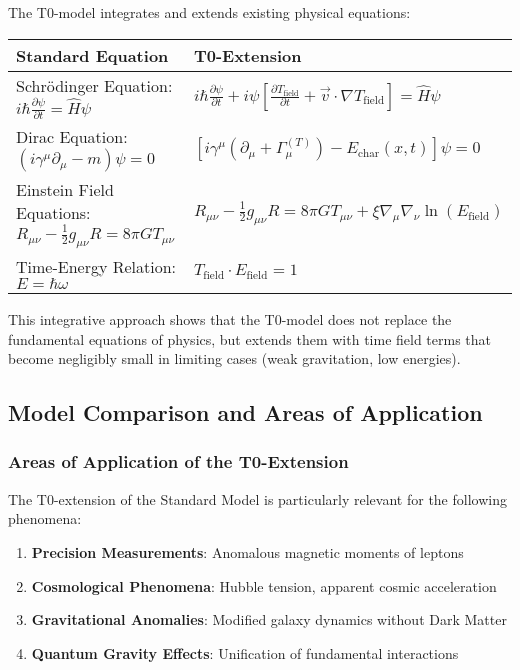 \documentclass[12pt,a4paper]{article}
\newcommand{\tfield}{T_{\text{field}}}
\theoremstyle{definition}
\begin{document}
	The T0-model integrates and extends existing physical equations:
	
	\begin{center}
		\begin{tabular}{|p{6cm}|p{8.5cm}|}
			\hline
			\textbf{Standard Equation} & \textbf{T0-Extension} \\
			\hline
			Schrödinger Equation: $i \hbar \frac{\partial\psi}{\partial t} = \hat{H}\psi$ & $i \hbar \frac{\partial\psi}{\partial t} + i\psi\left[\frac{\partial \tfield}{\partial t} + \vec{v} \cdot \nabla \tfield\right] = \hat{H}\psi$ \\
			\hline
			Dirac Equation: $(i\gamma^\mu \partial_\mu - m)\psi = 0$ & $\left[i\gamma^\mu\left(\partial_\mu + \Gamma_\mu^{(T)}\right) - E_{\text{char}}(x,t)\right]\psi = 0$ \\
			\hline
			Einstein Field Equations: $R_{\mu\nu} - \frac{1}{2}g_{\mu\nu}R = 8\pi G T_{\mu\nu}$ & $R_{\mu\nu} - \frac{1}{2}g_{\mu\nu}R = 8\pi G T_{\mu\nu} + \xi\nabla_\mu\nabla_\nu\ln(E_{\text{field}})$ \\
			\hline
			Time-Energy Relation: $E = \hbar\omega$ & $T_{\text{field}} \cdot E_{\text{field}} = 1$ \\
			\hline
		\end{tabular}
	\end{center}
	
	This integrative approach shows that the T0-model does not replace the fundamental equations of physics, but extends them with time field terms that become negligibly small in limiting cases (weak gravitation, low energies).
	
	\subsection{Model Comparison and Areas of Application}
	
	\subsubsection{Areas of Application of the T0-Extension}
	
	The T0-extension of the Standard Model is particularly relevant for the following phenomena:
	
	\begin{enumerate}
		\item \textbf{Precision Measurements}: Anomalous magnetic moments of leptons
		\item \textbf{Cosmological Phenomena}: Hubble tension, apparent cosmic acceleration
		\item \textbf{Gravitational Anomalies}: Modified galaxy dynamics without Dark Matter
		\item \textbf{Quantum Gravity Effects}: Unification of fundamental interactions
	\end{enumerate}
	
\end{document}
